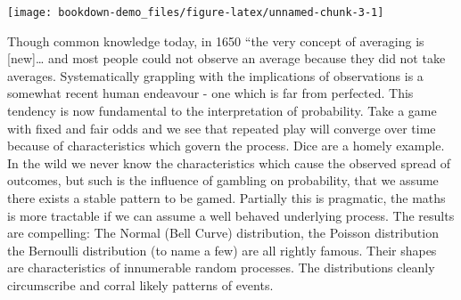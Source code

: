 \documentclass[]{tufte-book}
\theoremstyle{definition}
\theoremstyle{definition}
\theoremstyle{definition}
\theoremstyle{remark}
\begin{document}
\texttt{[image: bookdown-demo\_files/figure-latex/unnamed-chunk-3-1]}

Though common knowledge today, in 1650 ``the very concept of averaging is {[}new{]}\ldots{} and most people could not observe an average because they did not take averages.\citep{HackingEmergence} Systematically grappling with the implications of observations is a somewhat recent human endeavour - one which is far from perfected. This tendency is now fundamental to the interpretation of probability. Take a game with fixed and fair odds and we see that repeated play will converge over time because of characteristics which govern the process. Dice are a homely example. In the wild we never know the characteristics which cause the observed spread of outcomes, but such is the influence of gambling on probability, that we assume there exists a stable pattern to be gamed. Partially this is pragmatic, the maths is more tractable if we can assume a well behaved underlying process. The results are compelling: The Normal (Bell Curve) distribution, the Poisson distribution the Bernoulli distribution (to name a few) are all rightly famous. Their shapes are characteristics of innumerable random processes. The distributions cleanly circumscribe and corral likely patterns of events.
\end{document}
